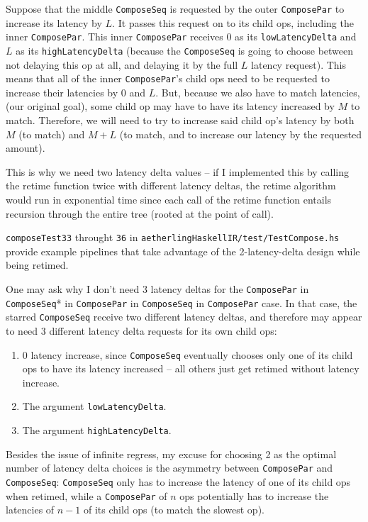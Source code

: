 \documentclass[12pt]{article}
\begin{document}
Suppose that the middle \texttt{ComposeSeq} is requested by the outer
\texttt{ComposePar} to increase its latency by $L$. It passes this
request on to its child ops, including the inner \texttt{ComposePar}.
This inner \texttt{ComposePar} receives 0 as its
\texttt{lowLatencyDelta} and $L$ as its \texttt{highLatencyDelta}
(because the \texttt{ComposeSeq} is going to choose between not
delaying this op at all, and delaying it by the full $L$ latency
request). This means that all of the inner \texttt{ComposePar}'s child
ops need to be requested to increase their latencies by 0 and
$L$. But, because we also have to match latencies, (our original
goal), some child op may have to have its latency increased by $M$ to
match. Therefore, we will need to try to increase said child op's
latency by both $M$ (to match) and $M+L$ (to match, and to increase
our latency by the requested amount).

This is why we need two latency delta values -- if I implemented this
by calling the retime function twice with different latency deltas,
the retime algorithm would run in exponential time since each call of
the retime function entails recursion through the entire tree (rooted
at the point of call).

\texttt{composeTest33} throught \texttt{36} in
\texttt{aetherlingHaskellIR/test/TestCompose.hs} provide example
pipelines that take advantage of the 2-latency-delta design
while being retimed.

One may ask why I don't need 3 latency deltas for the
\texttt{ComposePar} in \texttt{ComposeSeq}* in \texttt{ComposePar} in
\texttt{ComposeSeq} in \texttt{ComposePar} case. In that case, the
starred \texttt{ComposeSeq} receive two different latency deltas, and
therefore may appear to need 3 different latency delta requests for its own
child ops:
\begin{enumerate}
\item 0 latency increase, since \texttt{ComposeSeq} eventually chooses
  only one of its child ops to have its latency increased -- all others
  just get retimed without latency increase.
\item The argument \texttt{lowLatencyDelta}.
\item The argument \texttt{highLatencyDelta}.
\end{enumerate}

Besides the issue of infinite regress, my excuse for choosing 2 as the
optimal number of latency delta choices is the asymmetry between
\texttt{ComposePar} and \texttt{ComposeSeq}: \texttt{ComposeSeq} only
has to increase the latency of one of its child ops when retimed,
while a \texttt{ComposePar} of $n$ ops potentially has to increase
the latencies of $n-1$ of its child ops (to match the slowest op).
\end{document}
